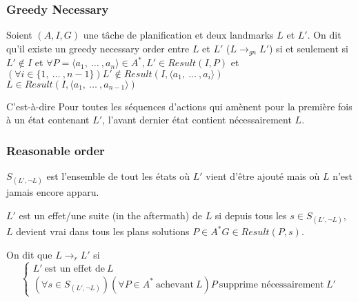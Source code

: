 \begin{frame}
  \frametitle{Greedy Necessary}

  \begin{definition}[$L \rightarrow_{gn} L'$]
     Soient $(A, I, G)$ une tâche de planification et deux landmarks $L$ et $L'$. On dit qu'il existe un greedy necessary order entre $L$ et $L'$ ($L \rightarrow_{gn} L'$) si et seulement si\\
    $L' \notin  I$ et $\forall P = \langle a_1,~\dots~, a_n\rangle \in A^*, L' \in Result(I, P)$ et $(\forall i \in \{1,~\dots~, n-1\}) L' \notin Result(I, \langle a_1,~\dots~,a_i\rangle)$
    $L \in Result(I, \langle a_1,~\dots~, a_{n-1}\rangle)$
  \end{definition}

  \begin{block}{C'est-à-dire}
    Pour toutes les séquences d'actions qui amènent pour la première fois à un état contenant $L'$, l'avant dernier état contient nécessairement $L$.
  \end{block}
\end{frame}

\begin{frame}
  \frametitle{Reasonable order}

  \begin{definition}[$S_{(L',\lnot L)}$]
    $S_{(L',\lnot L)}$ est l'ensemble de tout les états où $L'$ vient d'être ajouté mais où $L$ n'est jamais encore apparu.
  \end{definition}

  \begin{definition}[Aftermath]
    $L'$ est un effet/une suite (in the aftermath) de $L$ si depuis tous les $s \in S_{(L', \lnot L)}$, $L$ devient vrai dans tous les plans solutions $P \in A^* G \in Result(P, s)$.
  \end{definition}

  \begin{definition}[$L \rightarrow_r L'$]
    On dit que  $L \rightarrow_r L'$ si
    \begin{equation*}
      \begin{cases}
        L'~\text{est un effet de}~L\\
        (\forall s \in S_{(L', \lnot L)})(\forall P \in A^*~\text{achevant}~L) P~\text{supprime nécessairement}~L'
      \end{cases}
    \end{equation*}
  \end{definition}
\end{frame}


